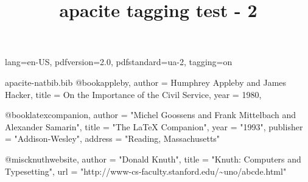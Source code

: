 \ifdefined\Uchar\RequirePackage{luatagging}\fi
\DocumentMetadata
  {
    lang=en-US,
    pdfversion=2.0,
    pdfstandard=ua-2,
    tagging=on
  }
\begin{filecontents}[noheader]{apacite-natbib.bib}
@book{appleby,
  author  = {Humphrey Appleby and James Hacker},
  title   = {On the Importance of the Civil Service},
  year    = {1980},
}

@book{latexcompanion,
    author    = "Michel Goossens and Frank Mittelbach and Alexander Samarin",
    title     = "The LaTeX Companion",
    year      = "1993",
    publisher = "Addison-Wesley",
    address   = "Reading, Massachusetts"
}

@misc{knuthwebsite,
    author    = "Donald Knuth",
    title     = "Knuth: Computers and Typesetting",
    url       = "http://www-cs-faculty.stanford.edu/\~{}uno/abcde.html"
}
\end{filecontents}

\documentclass{article}

\usepackage[natbibapa]{apacite}
\usepackage{hyperref}

\title{apacite tagging test - 2}


\tableofcontents
\section{A section}

\citep[p.~11]{appleby,latexcompanion}

\citet[p.~11]{appleby,latexcompanion}


\citeyear[p.~11]{appleby,latexcompanion}







